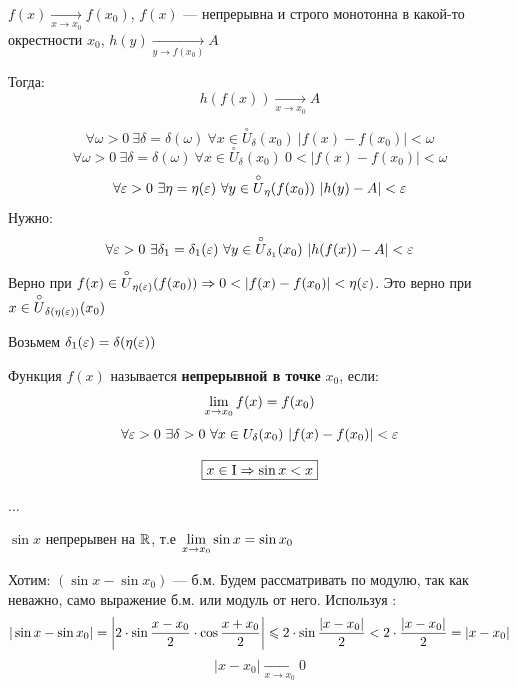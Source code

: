\begin{theorem}
    $f(x) \xrightarrow[x \to x_0]{} f(x_0)$, $f(x)$ --- непрерывна и строго монотонна в какой-то окрестности $x_0$, $h(y) \xrightarrow[y \to f(x_0)]{} A$

    Тогда:
    \[
        h(f(x)) \xrightarrow[x \to x_0]{} A
    \]
\end{theorem}

\begin{Proof}
    \[
        \forall \omega > 0\ \exists \delta = \delta (\omega )\ \forall x \in \overset{\circ}{U}_{\delta }(x_0)\ |f(x) - f(x_0)| < \omega
    \]
    \[
        \forall \omega > 0\ \exists \delta = \delta (\omega )\ \forall x \in \overset{\circ}{U}_{\delta }(x_0)\ 0 < |f(x) - f(x_0)| < \omega
    \]
    \[
        \forall \varepsilon > 0\ \exists \eta = \eta (\varepsilon )\ \forall y \in \overset{\circ}{U}_{\eta }(f(x_0))\ |h(y) - A| < \varepsilon 
    \]
    Нужно: 
    \[
        \forall \varepsilon > 0\ \exists \delta_1 = \delta_1 (\varepsilon )\ \forall y \in \overset{\circ}{U}_{\delta_1 }(x_0)\ |h(f(x)) - A| < \varepsilon 
    \]
    Верно при $f(x) \in \overset{\circ}{U}_{\eta(\varepsilon ) }(f(x_0)) \Rightarrow 0 < |f(x) - f(x_0)| < \eta(\varepsilon )$. Это верно при $x \in \overset{\circ}{U}_{\delta(\eta (\varepsilon )) }(x_0) $

    Возьмем $\delta_1(\varepsilon ) = \delta (\eta (\varepsilon ))$
\end{Proof}

\begin{definition}
    Функция $f(x)$ называется \textbf{непрерывной в точке} $x_0$, если: 
    \[
        \lim\limits_{x \to x_0} f(x) = f(x_0)
    \]
    \[
        \forall \eps > 0\ \exists \delta > 0\ \forall x \in U_{\delta }(x_0)\ |f(x) - f(x_0)| < \eps  
    \]
\end{definition}

\begin{example}[]
    \[
        \fbox{$x \in \text{I} \Rightarrow \sin x < x$}
    \]
\end{example}
\begin{Proof}
$\ldots$
\end{Proof}

\begin{example}
    $\sin x$ непрерывен на $\mathbb{R}$, т.е $\lim\limits_{x \to x_0} \sin x = \sin x_0$

    Хотим: $(\sin x - \sin x_0)$ --- б.м. Будем рассматривать по модулю, так как неважно, само выражение б.м. или модуль от него. Используя :
    \[
        |\sin x - \sin x_0| = \left|2 \cdot \sin \frac{x - x_0}{2} \cdot \cos \frac{x + x_0}{2} \right| \leqslant 2 \cdot \sin \frac{|x - x_0|}{2} < 2 \cdot \frac{|x - x_0|}{2} = |x - x_0|
    \]
    \[
        |x - x_0| \xrightarrow[x \to x_0]{} 0
    \]
\end{example}

